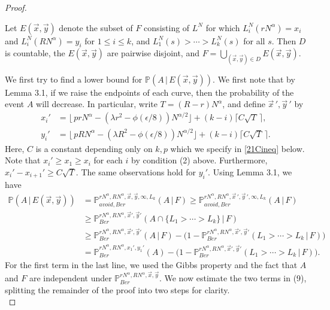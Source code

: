 \documentclass[12pt]{article}
\begin{document}
\begin{proof}
\begin{enumerate}[label=(\arabic*)]
	\end{enumerate}
	
	Let $E(\vec{x},\vec{y})$ denote the subset of $F$ consisting of $L^N$ for which $L_i^N(rN^\alpha) = x_i$ and $L_i^N(RN^\alpha)=y_i$ for $1\leq i\leq k$, and $L_1^N(s) > \cdots > L_k^N(s)$ for all $s$. Then $D$ is countable, the $E(\vec{x},\vec{y})$ are pairwise disjoint, and $F = \bigcup_{(\vec{x},\vec{y})\in D} E(\vec{x},\vec{y})$.
	
	We first try to find a lower bound for $\mathbb{P}(A\,|\,E(\vec{x},\vec{y}))$. We first note that by Lemma 3.1, if we raise the endpoints of each curve, then the probability of the event $A$ will decrease. In particular, write $T = (R-r)N^\alpha$, and define $\vec{x}\,',\vec{y}\,'$ by
	\begin{align*}
	x_i' &= \lfloor\, prN^\alpha - (\lambda r^2 - \phi(\epsilon/8))N^{\alpha/2}\rfloor + (k-i)\lceil C\sqrt{T}\,\rceil,\\
	y_i' &= \lfloor\, pRN^\alpha - (\lambda R^2 - \phi(\epsilon/8))N^{\alpha/2}\rfloor + (k-i)\lceil C\sqrt{T}\,\rceil.
	\end{align*}
	Here, $C$ is a constant depending only on $k,p$ which we specify in \eqref{21Cineq} below. Note that $x_i' \geq x_1 \geq x_i$ for each $i$ by condition (2) above. Furthermore, $x_i' - x_{i+1}' \geq C\sqrt{T}$. The same observations hold for $y_i'$. Using Lemma 3.1, we have
	\begin{align}
	\mathbb{P}(A\,|\,E(\vec{x},\vec{y})) &= \mathbb{P}^{rN^\alpha, RN^\alpha,\vec{x},\vec{y},\infty,L_k}_{avoid,Ber} (A\,|\,F) \geq \mathbb{P}^{rN^\alpha, RN^\alpha,\vec{x}\,',\vec{y}\,',\infty,L_k}_{avoid,Ber} (A\,|\,F) \nonumber \\
	&\geq \mathbb{P}^{rN^\alpha, RN^\alpha,\vec{x}',\vec{y}'}_{Ber} (A\cap\{L_1 > \cdots > L_k\}\,|\,F) \nonumber \\
	&\geq \mathbb{P}^{rN^\alpha, RN^\alpha,\vec{x}',\vec{y}'}_{Ber} (A\,|\,F) - \big( 1 - \mathbb{P}^{rN^\alpha, RN^\alpha,\vec{x}',\vec{y}'}_{Ber} (L_1 > \cdots > L_k\,|\,F)\big) \nonumber\\
	&= \mathbb{P}^{rN^\alpha, RN^\alpha,x_1',y_1'}_{Ber} (A) - \big( 1 - \mathbb{P}^{rN^\alpha, RN^\alpha,\vec{x}',\vec{y}'}_{Ber} (L_1 > \cdots > L_k\,|\,F)\big). \label{21xyest}
	\end{align}
	For the first term in the last line, we used the Gibbs property and the fact that $A$ and $F$ are independent under $\mathbb{P}^{rN^\alpha, RN^\alpha,\vec{x},\vec{y}}_{Ber}$. We now estimate the two terms in (9), splitting the remainder of the proof into two steps for clarity.\\
	

\end{proof}
\end{document}
